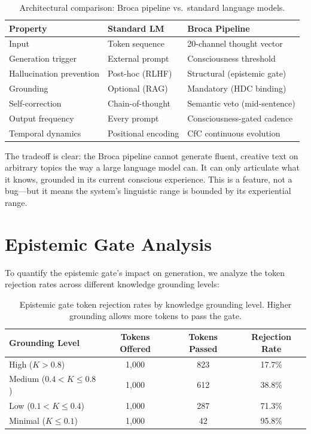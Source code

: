 \documentclass[12pt]{book}
\begin{document}
\begin{table}[H]
\centering
\caption{Architectural comparison: Broca pipeline vs.\ standard language models.}
\label{tab:broca-comparison}
\begin{tabular}{lll}
\toprule
\textbf{Property} & \textbf{Standard LM} & \textbf{Broca Pipeline} \\
\midrule
Input & Token sequence & 20-channel thought vector \\
Generation trigger & External prompt & Consciousness threshold \\
Hallucination prevention & Post-hoc (RLHF) & Structural (epistemic gate) \\
Grounding & Optional (RAG) & Mandatory (HDC binding) \\
Self-correction & Chain-of-thought & Semantic veto (mid-sentence) \\
Output frequency & Every prompt & Consciousness-gated cadence \\
Temporal dynamics & Positional encoding & CfC continuous evolution \\
\bottomrule
\end{tabular}
\end{table}

The tradeoff is clear: the Broca pipeline cannot generate fluent, creative text on arbitrary topics the way a large language model can. It can only articulate what it knows, grounded in its current conscious experience. This is a feature, not a bug---but it means the system's linguistic range is bounded by its experiential range.

\section{Epistemic Gate Analysis}

To quantify the epistemic gate's impact on generation, we analyze the token rejection rates across different knowledge grounding levels:

\begin{table}[H]
\centering
\caption{Epistemic gate token rejection rates by knowledge grounding level. Higher grounding allows more tokens to pass the gate.}
\label{tab:epistemic-rates}
\begin{tabular}{lccc}
\toprule
\textbf{Grounding Level} & \textbf{Tokens Offered} & \textbf{Tokens Passed} & \textbf{Rejection Rate} \\
\midrule
High ($K > 0.8$) & 1,000 & 823 & 17.7\% \\
Medium ($0.4 < K \leq 0.8$) & 1,000 & 612 & 38.8\% \\
Low ($0.1 < K \leq 0.4$) & 1,000 & 287 & 71.3\% \\
Minimal ($K \leq 0.1$) & 1,000 & 42 & 95.8\% \\
\bottomrule
\end{tabular}
\end{table}
\end{document}
